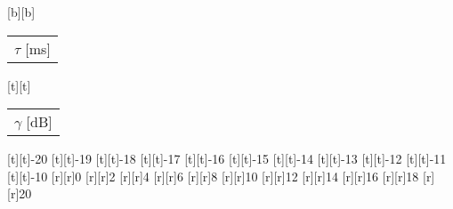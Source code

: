 %    
%
%
%
[b][b]{\fontsize{8}{12}\selectfont \color[rgb]{0,0,0}\setlength{\tabcolsep}{0pt}\begin{tabular}{c}$\tau$ [ms]\end{tabular}}%
[t][t]{\fontsize{8}{12}\selectfont \color[rgb]{0,0,0}\setlength{\tabcolsep}{0pt}\begin{tabular}{c}$\gamma$ [dB]\end{tabular}}%
%
\fontsize{8}{12}%
\selectfont%
%
[t][t]{-20}%
[t][t]{-19}%
[t][t]{-18}%
[t][t]{-17}%
[t][t]{-16}%
[t][t]{-15}%
[t][t]{-14}%
[t][t]{-13}%
[t][t]{-12}%
[t][t]{-11}%
[t][t]{-10}%
%
[r][r]{0}%
[r][r]{2}%
[r][r]{4}%
[r][r]{6}%
[r][r]{8}%
[r][r]{10}%
[r][r]{12}%
[r][r]{14}%
[r][r]{16}%
[r][r]{18}%
[r][r]{20}%
%
%
